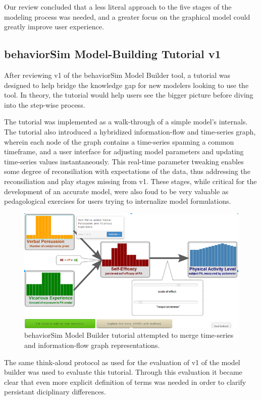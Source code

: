 \documentclass[conference]{IEEEtran}
\begin{document}
Our review concluded that a less literal approach to the five stages of the modeling process was needed, and a greater focus on the graphical model could greatly improve user experience.

\subsection{behaviorSim Model-Building Tutorial v1}
After reviewing v1 of the behaviorSim Model Builder tool, a tutorial was designed to help bridge the knowledge gap for new modelers looking to use the tool.
In theory, the tutorial would help users see the bigger picture before diving into the step-wise process.

The tutorial was implemented as a walk-through of a simple model's internals.
The tutorial also introduced a hybridized information-flow and time-series graph, wherein each node of the graph contains a time-series spanning a common timeframe, and a user interface for adjusting model parameters and updating time-series values instantaneously.
This real-time parameter tweaking enables some degree of reconsiliation with expectations of the data, thus addressing the reconsiliation and play stages missing from v1.
These stages, while critical for the development of an accurate model, were also foud to be very valuable as pedagological exercises for users trying to internalize model formulations.
 
\begin{figure}[!t]
  \centering
  \includegraphics[width=0.9\columnwidth]{img/v1-flow}  
  \caption{behaviorSim Model Builder tutorial attempted to merge time-series and information-flow graph representations.}
  \label{model-builder-tutorial}
\end{figure}

The same think-aloud protocol as used for the evaluation of v1 of the model builder was used to evaluate this tutorial. 
Through this evaluation it became clear that even more explicit definition of terms was needed in order to clarify persistant diciplinary differences.
\end{document}

